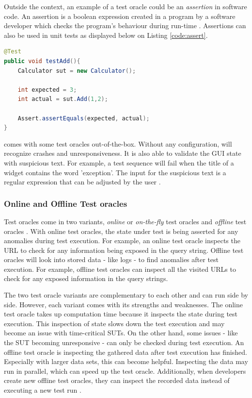 Outside the \testar context, an example of a test oracle could be an \emph{assertion} in software code. An assertion is a boolean expression created in a program by a software developer which checks the program's behaviour during run-time \cite{barr2014oracle}. Assertions can also be used in unit tests as displayed below on Listing \ref{code:assert}. 

\begin{lstlisting}[language=Java, caption=Example assertion, label=code:assert]
@Test
public void testAdd(){
    Calculator sut = new Calculator();

    int expected = 3;
    int actual = sut.Add(1,2);

    Assert.assertEquals(expected, actual);
}
\end{lstlisting}

\testar comes with some test oracles out-of-the-box. Without any configuration, \testar will recognize crashes and unresponsiveness. It is also able to validate the GUI state with suspicious text. For example, a test sequence will fail when the title of a widget contains the word 'exception'. The input for the suspicious text is a regular expression that can be adjusted by the \testar user \cite{VosAho2021}. 

\subsubsection{Online and Offline Test oracles}
Test oracles come in two variants, \emph{online} or \emph{on-the-fly} test oracles and \emph{offline} test oracles \cite{VosAho2021}. With online test oracles, the state under test is being asserted for any anomalies during test execution. For example,  an online test oracle inspects the URL to check for any information being exposed in the query string. Offline test oracles will look into stored data - like logs - to find anomalies after test execution. For example, offline test oracles can inspect all the visited URLs to check for any exposed information in the query strings.

The two test oracle variants are complementary to each other and can run side by side. However, each variant comes with its strengths and weaknesses. The online test oracle takes up computation time because it inspects the state during test execution. This inspection of state slows down the test execution and may become an issue with time-critical SUTs. On the other hand, some issues - like the SUT becoming unresponsive - can only be checked during test execution. An offline test oracle is inspecting the gathered data after test execution has finished. Especially with larger data sets, this can become helpful. Inspecting the data may run in parallel, which can speed up the test oracle. Additionally, when developers create new offline test oracles, they can inspect the recorded data instead of executing a new test run \cite{de2019offline}.

